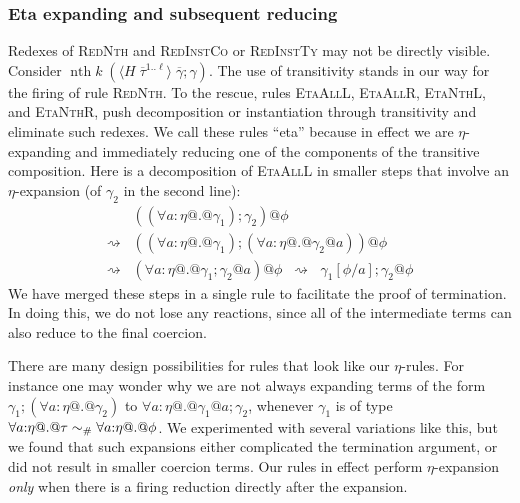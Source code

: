 \documentclass[a4paper,UKenglish]{lipics}
\makeatletter
\def\rulename#1{\textsc{#1}}
\newcommand{\psim}{\mathrel{\sim_{\tiny \#}}}
\def\rulename#1{\textsc{#1}}
\newcommand{\ol}[1]{\overline{#1}}
\newcommand{\nth}[2]{\mathop{nth} #1\;#2}
\newcommand{\inst}[2]{#1@#2}
\newcommand{\refl}[1]{\langle#1\rangle}  %
\newcommand{\rsa}[1]{\rightsquigarrow_{#1}}
\newcommand{\gammas}{\ol{\gamma}}
\newcommand{\taus}{\ol{\tau}}
\makeatother
\begin{document}
\subsubsection{Eta expanding and subsequent reducing}
Redexes of \rulename{RedNth} and \rulename{RedInstCo} or \rulename{RedInstTy} may not be directly visible. 
Consider $\nth{k}{(\refl{H\;\taus^{1..\ell}}\;\gammas;\gamma)}$. The use of transitivity stands in our way for the 
firing of rule \rulename{RedNth}. To the rescue, rules \rulename{EtaAllL}, \rulename{EtaAllR}, \rulename{EtaNthL}, 
and \rulename{EtaNthR}, push decomposition or instantiation through transitivity and eliminate such redexes. 
We call these rules ``eta'' because in effect we are $\eta$-expanding and immediately reducing one of the components of the transitive composition. 
Here is a decomposition of \rulename{EtaAllL} in smaller steps that involve an $\eta$-expansion (of $\gamma_2$ in the second line): 
\[\begin{array}{ll}
        & \inst{((\forall a{:}\eta @.@ \gamma_1);\gamma_2)}{\phi} \\
   \rsa{} & \inst{((\forall a{:}\eta @.@ \gamma_1);(\forall a{:}\eta @.@ \inst{\gamma_2}{a}))}{\phi}          \\ 
 \rsa{} & \inst{(\forall a{:}\eta @.@ \gamma_1;\inst{\gamma_2}{a})}{\phi} \;\;\rsa{}\;\; \gamma_1[\phi/a] ; \inst{\gamma_2}{\phi} 
\end{array}\]
We have merged these steps in a single rule to facilitate the proof of 
termination. In doing this, we do not lose any reactions, since all of the intermediate terms can also reduce to the final coercion.

There are many design possibilities for rules that look like our $\eta$-rules. For instance one may wonder why 
we are not always expanding terms of the form $\gamma_1;(\forall a{:}\eta @.@ \gamma_2)$ to $\forall a{:}\eta @.@ \inst{\gamma_1}{a} ; \gamma_2$, 
whenever $\gamma_1$ is of type $\forall a{:}\eta @.@ \tau \psim \forall a{:}\eta @.@ \phi$. We experimented with several variations like this, but we found 
that such expansions either complicated the termination argument, or did not result in smaller coercion terms. Our rules in 
effect perform $\eta$-expansion {\em only} when there is a firing reduction directly after the expansion. 

\end{document}
